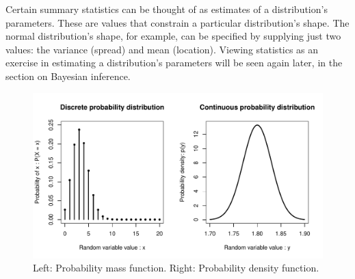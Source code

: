 \documentclass[11pt,a4paper,article]{memoir} %
\begin{document}
Certain summary statistics can be thought of as estimates of a distribution's parameters. These are values that constrain a particular distribution's shape. The normal distribution's shape, for example, can be specified by supplying just two values: the variance (spread) and mean (location). Viewing statistics as an exercise in estimating a distribution's parameters will be seen again later, in the section on Bayesian inference.

\begin{figure}
\includegraphics[width=\textwidth]{probability_distributions.pdf}
\caption{Left: Probability mass function. Right: Probability density function.}
\label{fig:example_pd}
\end{figure}
\par

\newpage
\end{document}
